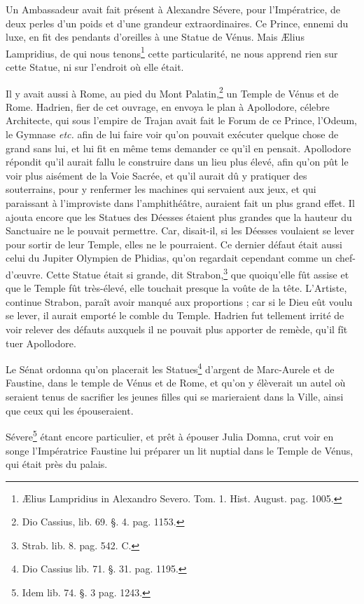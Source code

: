 \documentclass[a4paper, 18pt, oneside]{article}
\begin{document}
Un Ambassadeur avait fait présent à Alexandre Sévere, pour l'Impératrice, de deux perles d'un poids et d'une grandeur extraordinaires. Ce Prince, ennemi du luxe, en fit des pendants d'oreilles à une Statue de Vénus. Mais Ælius Lampridius, de qui nous tenons\footnote{Ælius Lampridius in Alexandro Severo. Tom. 1. Hist. August. pag. 1005.} cette particularité, ne nous apprend rien sur cette Statue, ni sur l'endroit où elle était.

Il y avait aussi à Rome, au pied du Mont Palatin,\footnote{Dio Cassius, lib. 69. §. 4. pag. 1153.} un Temple de Vénus et de Rome. Hadrien, fier de cet ouvrage, en envoya le plan à Apollodore, célebre Architecte, qui sous l'empire de Trajan avait fait le Forum de ce Prince, l'Odeum, le Gymnase \emph{etc.} afin de lui faire voir qu'on pouvait exécuter quelque chose de grand sans lui, et lui fit en même tems demander ce qu'il en pensait. Apollodore répondit qu'il aurait fallu le construire dans un lieu plus élevé, afin qu'on pût le voir plus aisément de la Voie Sacrée, et qu'il aurait dû y pratiquer des souterrains, pour y renfermer les machines qui servaient aux jeux, et qui paraissant à l'improviste dans l'amphithéâtre, auraient fait un plus grand effet. Il ajouta encore que les Statues des Déesses étaient plus grandes que la hauteur du Sanctuaire ne le pouvait permettre. Car, disait-il, si les Déesses voulaient se lever pour sortir de leur Temple, elles ne le pourraient. Ce dernier défaut était aussi celui du Jupiter Olympien de Phidias, qu'on regardait cependant comme un chef-d'œuvre. Cette Statue était si grande, dit Strabon,\footnote{Strab. lib. 8. pag. 542. C.} que quoiqu'elle fût assise et que le Temple fût très-élevé, elle touchait presque la voûte de la tête. L'Artiste, continue Strabon, paraît avoir manqué aux proportions ; car si le Dieu eût voulu se lever, il aurait emporté le comble du Temple. Hadrien fut tellement irrité de voir relever des défauts auxquels il ne pouvait plus apporter de remède, qu'il fît tuer Apollodore.

Le Sénat ordonna qu'on placerait les Statues\footnote{Dio Cassius lib. 71. §. 31. pag. 1195.} d'argent de Marc-Aurele et de Faustine, dans le temple de Vénus et de Rome, et qu'on y élèverait un autel où seraient tenus de sacrifier les jeunes filles qui se marieraient dans la Ville, ainsi que ceux qui les épouseraient.

Sévere\footnote{Idem lib. 74. §. 3 pag. 1243.} étant encore particulier, et prêt à épouser Julia Domna, crut voir en songe l'Impératrice Faustine lui préparer un lit nuptial dans le Temple de Vénus, qui était près du palais.
\end{document}
